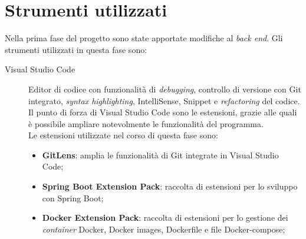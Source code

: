 \section{Strumenti utilizzati}
Nella prima fase del progetto sono state apportate modifiche al \textit{back
      end}. Gli strumenti utilizzati in questa fase sono:
\begin{description}
      \item[Visual Studio Code] Editor di codice con
            funzionalità di \textit{debugging}, controllo di versione con Git
            integrato,
            \textit{syntax highlighting}, IntelliSense,
            Snippet e \textit{refactoring} del codice.\\
            Il punto di forza di Visual Studio Code sono le estensioni, grazie
            alle quali è possibile ampliare notevolmente le funzionalità del
            programma.\\
            Le estensioni utilizzate nel corso di questa fase sono:
            \begin{itemize}
                  \item \textbf{GitLens}: amplia le funzionalità di Git
                        integrate in
                        Visual Studio Code;
                  \item \textbf{Spring Boot Extension Pack}: raccolta di
                        estensioni per lo sviluppo con Spring Boot;

                  \item \textbf{Docker Extension Pack}: raccolta di estensioni
                        per lo
                        gestione dei \textit{container} Docker, Docker images,
                        Dockerfile e
                        file
                        Docker-compose;


\end{itemize}
\end{description}
